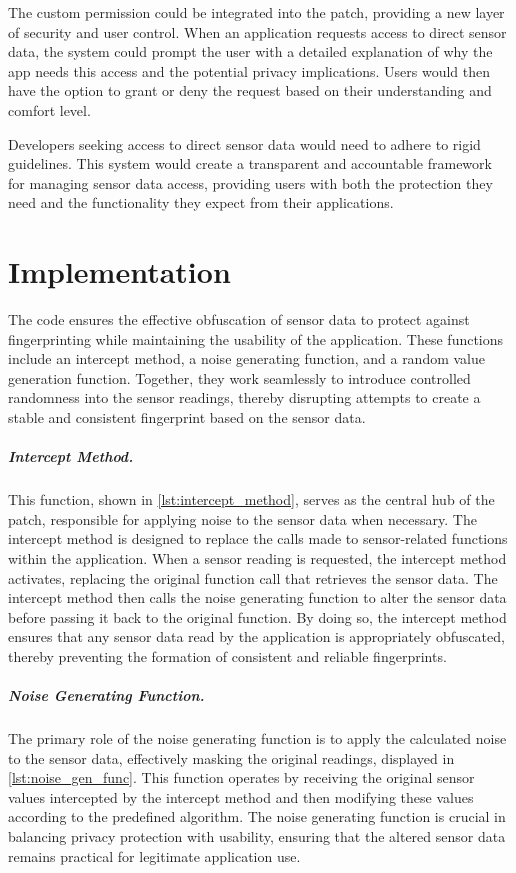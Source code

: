 \documentclass[11pt,
  oneside,openany,    %
]{scrreprt}
\begin{document}
The custom permission could be integrated into the patch, providing a new layer of security and user control. 
When an application requests access to direct sensor data, the system could prompt the user with a detailed explanation of why the app needs this access and the potential privacy implications. 
Users would then have the option to grant or deny the request based on their understanding and comfort level.

Developers seeking access to direct sensor data would need to adhere to rigid guidelines.
This system would create a transparent and accountable framework for managing sensor data access, providing users with both the protection they need and the functionality they expect from their applications.

\chapter{Implementation}
\label{chap:implementation}
The code ensures the effective obfuscation of sensor data to protect against fingerprinting while maintaining the usability of the application. 
These functions include an intercept method, a noise generating function, and a random value generation function. 
Together, they work seamlessly to introduce controlled randomness into the sensor readings, thereby disrupting attempts to create a stable and consistent fingerprint based on the sensor data.

\paragraph{Intercept Method.}
\label{par:intercept_method}
This function, shown in \ref{lst:intercept_method}, serves as the central hub of the patch, responsible for applying noise to the sensor data when necessary.
The intercept method is designed to replace the calls made to sensor-related functions within the application. 
When a sensor reading is requested, the intercept method activates, replacing the original function call that retrieves the sensor data.
The intercept method then calls the noise generating function to alter the sensor data before passing it back to the original function. 
By doing so, the intercept method ensures that any sensor data read by the application is appropriately obfuscated, thereby preventing the formation of consistent and reliable fingerprints.

\paragraph{Noise Generating Function.}
\label{par:noise_gen_func}
The primary role of the noise generating function is to apply the calculated noise to the sensor data, effectively masking the original readings, displayed in \ref{lst:noise_gen_func}.
This function operates by receiving the original sensor values intercepted by the intercept method and then modifying these values according to the predefined algorithm. 
The noise generating function is crucial in balancing privacy protection with usability, ensuring that the altered sensor data remains practical for legitimate application use.
\end{document}
